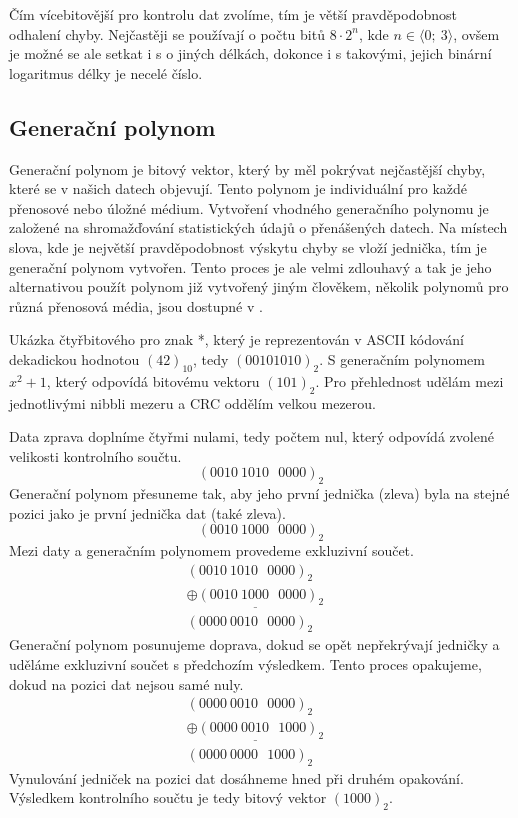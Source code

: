 Čím vícebitovější  pro kontrolu dat zvolíme, tím je větší pravděpodobnost odhalení chyby. Nejčastěji se používají  o počtu bitů $8 \cdot 2^n$, kde $n \in \langle 0;~3\rangle$, ovšem je možné se ale setkat i s  o jiných délkách, dokonce i s takovými, jejich binární logaritmus délky je necelé číslo.

\subsection{Generační polynom}
Generační polynom je bitový vektor, který by měl pokrývat nejčastější chyby, které se v našich datech objevují. Tento polynom je individuální pro každé přenosové nebo úložné médium. Vytvoření vhodného generačního polynomu je založené na shromažďování statistických údajů o přenášených datech. Na místech slova, kde je největší pravděpodobnost výskytu chyby se vloží jednička, tím je generační polynom vytvořen. Tento proces je ale velmi zdlouhavý a tak je jeho alternativou použít polynom již vytvořený jiným člověkem, několik polynomů pro různá přenosová média, jsou dostupné v \cite{crc-wiki}.


Ukázka čtyřbitového  pro znak *, který je reprezentován v ASCII kódování dekadickou hodnotou $(42)_{10}$, tedy $(00101010)_2$. S generačním polynomem $x^2+1$, který odpovídá bitovému vektoru $(101)_2$. Pro přehlednost udělám mezi jednotlivými nibbli mezeru a CRC oddělím velkou mezerou.

Data zprava doplníme čtyřmi nulami, tedy počtem nul, který odpovídá zvolené velikosti kontrolního součtu.
$$ (0010~1010~~~0000)_2 $$
Generační polynom přesuneme tak, aby jeho první jednička (zleva) byla na stejné pozici jako je první jednička dat (také zleva).
$$ (0010~1000~~~0000)_2 $$
Mezi daty a generačním polynomem provedeme exkluzivní součet.
\begin{eqnarray}
    (0010~1010~~~0000)_2  & \nonumber\\\underline{\oplus
    (0010~1000~~~0000)_2} & \nonumber\\
    (0000~0010~~~0000)_2  & \nonumber
\end{eqnarray}
Generační polynom posunujeme doprava, dokud se opět nepřekrývají jedničky a uděláme exkluzivní součet s předchozím výsledkem. Tento proces opakujeme, dokud na pozici dat nejsou samé nuly.
\begin{eqnarray}
    (0000~0010~~~0000)_2  & \nonumber\\\underline{\oplus
    (0000~0010~~~1000)_2} & \nonumber\\
    (0000~0000~~~1000)_2  & \nonumber
\end{eqnarray}
Vynulování jedniček na pozici dat dosáhneme hned při druhém opakování. Výsledkem kontrolního součtu je tedy bitový vektor $(1000)_2$.

